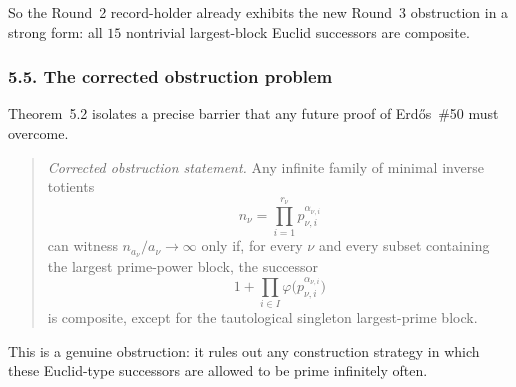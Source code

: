 So the Round~2 record-holder already exhibits the new Round~3 obstruction in a strong form: all $15$ nontrivial largest-block Euclid successors are composite.

\subsubsection*{5.5. The corrected obstruction problem}
Theorem~5.2 isolates a precise barrier that any future proof of Erd\H{o}s~\#50 must overcome.

\begin{quote}
\emph{Corrected obstruction statement.}
Any infinite family of minimal inverse totients
\[
 n_\nu=\prod_{i=1}^{r_\nu} p_{\nu,i}^{\alpha_{\nu,i}}
\]
can witness $n_{a_\nu}/a_\nu\to\infty$ only if, for every $\nu$ and every subset containing the largest prime-power block, the successor
\[
 1+\prod_{i\in I} \varphi\!\bigl(p_{\nu,i}^{\alpha_{\nu,i}}\bigr)
\]
is composite, except for the tautological singleton largest-prime block.
\end{quote}

This is a genuine obstruction: it rules out any construction strategy in which these Euclid-type successors are allowed to be prime infinitely often.

